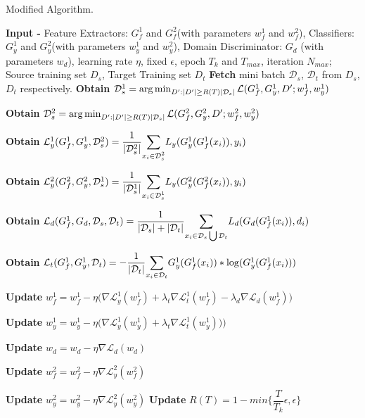 \begin{algorithm}[H]
	\caption{Modified Algorithm.} 
	\begin{algorithmic}[1]
	    \State \textbf{Input -} Feature Extractors: $G_{f}^1$ and $G_{f}^2$(with parameters $w_{f}^1$ and $w_{f}^2$), Classifiers: $G_{y}^1$ and $G_{y}^2$(with parameters $w_{y}^1$ and $w_{y}^2$), Domain Discriminator: $G_d$ (with parameters $w_d$), learning rate $\eta$, fixed $\epsilon$, epoch $T_k$ and $T_{max}$, iteration $N_{max}$;
		    \State Source training set ${D_s}$, Target Training set ${D_t}$
				    \State \textbf{Fetch} mini batch $\mathcal{D}_s$, $\mathcal{D}_t$ from ${D_s}$, ${D_t}$ respectively.
				    \State \textbf{Obtain} $\mathcal{D}_{s}^1 = \operatorname*{arg\,min}_{D':|D'|\geq R(T)|\mathcal{D}_{s}|} \mathcal{L}(G_{f}^1, G_{y}^1, D'; w_{f}^1, w_{y}^1)$ 
				    
				    \State \textbf{Obtain} $\mathcal{D}_{s}^2 = \operatorname*{arg\,min}_{D':|D'|\geq R(T)|\mathcal{D}_{s}|} \mathcal{L}(G_{f}^2, G_{y}^2, D'; w_{f}^2, w_{y}^2)$
				
				    \State \textbf{Obtain} $\mathcal{L}_{y}^1(G_{f}^1, G_{y}^1,\mathcal{D}_{s}^2) =\dfrac{1}{|\mathcal{D}_{s}^2|} \mathlarger\sum\limits_{x_i \in \mathcal{D}_{s}^2} L_y(G_{y}^1(G_{f}^1(x_i)),y_i)$
				    
                    \State \textbf{Obtain} $\mathcal{L}_{y}^2(G_{f}^2, G_{y}^2, \mathcal{D}_{s}^1) =\dfrac{1}{|\mathcal{D}_{s}^1|} \mathlarger\sum\limits_{x_i \in \mathcal{D}_{s}^1} L_y(G_{y}^2(G_{f}^2(x_i)),y_i)$
				    
				    \State \textbf{Obtain} $\mathcal{L}_d(G_{f}^1, G_{d}, \mathcal{D}_s, \mathcal{D}_t) = \dfrac{1}{|\mathcal{D}_s| + |\mathcal{D}_t|} \mathlarger\sum\limits_{x_i \in \mathcal{D}_s \bigcup \mathcal{D}_t} L_d(G_d(G_{f}^1(x_i)), d_i)$
				    
				    \State \textbf{Obtain} $\mathcal{L}_t(G_{f}^1, G_{y}^1, \mathcal{D}_t) = - \dfrac{1}{|\mathcal{D}_t|} \mathlarger\sum\limits_{x_i \in \mathcal{D}_t} G_{y}^1(G_{f}^1(x_i))*\log(G_{y}^1(G_{f}^1(x_i)))$
				    
				    \State \textbf{Update} $w_{f}^1 = w_{f}^1 - \eta \big( \nabla \mathcal{L}_{y}^1(w_{f}^1) + \lambda_t \nabla \mathcal{L}_{t}^1(w_{f}^1) - \lambda_d \nabla \mathcal{L}_{d}(w_{f}^1)\big)$
				    
				    \State \textbf{Update} $w_{y}^1 = w_{y}^1 - \eta \big(\nabla \mathcal{L}_{y}^1(w_{y}^1)+ \lambda_t \nabla\mathcal{L}_{t}^1(w_{y}^1))\big)$
				    
				    \State \textbf{Update} $w_{d} = w_{d} - \eta \nabla \mathcal{L}_{d}(w_{d})$
				    
				    \State \textbf{Update} $w_{f}^2 = w_{f}^2 - \eta \nabla \mathcal{L}_{y}^2(w_{f}^2)$
				    
				    \State \textbf{Update} $w_{y}^2 = w_{y}^2 - \eta \nabla \mathcal{L}_{y}^2(w_{y}^2)$
			    \EndFor
			 \State \textbf{Update} $R(T)= 1- min\bigg\{\dfrac{T}{T_k}\epsilon, \epsilon\bigg\}$
	\EndFor
	\end{algorithmic} 
\end{algorithm}
